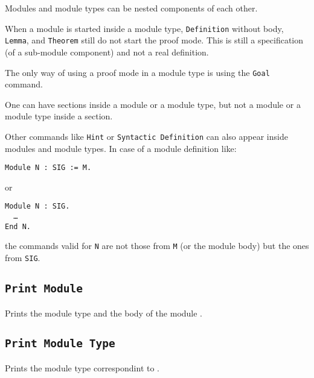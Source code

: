 \begin{Remarks}
\item Modules and module types can be nested components of each other.
\item When a module is started inside a module type,
  \texttt{Definition} without body, \texttt{Lemma}, and
  \texttt{Theorem} still do not start the proof mode.  This is still a
  specification (of a sub-module component) and not a real definition.
\item The only way of using a proof mode in a module type is using the 
  \texttt{Goal} command.
\item One can have sections inside a module or a module type, but
  not a module or a module type inside a section.
\item Other commands like \texttt{Hint} or \texttt{Syntactic
    Definition} can also appear inside modules and module types. In
    case of a module definition like:

    \medskip
    \noindent
    {\tt Module N : SIG := M.} 
    \medskip

    or

    \medskip
    {\tt Module N : SIG.\\
      \ \ \dots\\
      End N.}
    \medskip 

    the commands valid for \texttt{N} are not those from
    \texttt{M} (or the module body) but the ones from \texttt{SIG}.

\end{Remarks}

\subsection{\tt Print Module {\ident}}
Prints the module type and the body of the module {\ident}.

\subsection{\tt Print Module Type {\ident}}
Prints the module type correspondint to {\ident}.


